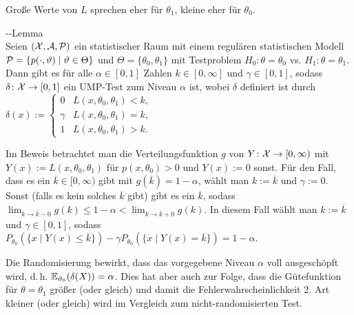 \begin{Bem}
    Große Werte von $L$ sprechen eher für $\theta_1$, kleine eher für $\theta_0$.
\end{Bem}

\begin{Satz}{--Lemma}\\
    Seien $(\X, \A, \P)$ ein statistischer Raum mit einem regulären statistischen Modell\\
    $\P = \{p(\cdot, \theta) \;|\; \theta \in \Theta\}$ und
    $\Theta = \{\theta_0, \theta_1\}$ mit Testproblem
    $H_0\colon \theta = \theta_0$ vs. $H_1\colon \theta = \theta_1$.\\
    Dann gibt es für alle $\alpha \in [0, 1]$ Zahlen $k \in [0, \infty]$ und $\gamma \in [0, 1]$,
    sodass $\delta\colon \X \rightarrow [0, 1]$ ein UMP-Test zum Niveau $\alpha$ ist, wobei
    $\delta$ definiert ist durch
    $\delta(x) := \begin{cases}0 & L(x, \theta_0, \theta_1) < k,\\
    \gamma & L(x, \theta_0, \theta_1) = k,\\1 & L(x, \theta_0, \theta_1) > k.\end{cases}$
\end{Satz}

\begin{Bem}
    Im Beweis betrachtet man die Verteilungsfunktion $g$ von $Y\colon \X \rightarrow [0, \infty)$
    mit $Y(x) := L(x, \theta_0, \theta_1)$ für $p(x, \theta_0) > 0$ und $Y(x) := 0$ sonst.
    Für den Fall, dass es ein $\overline{k} \in [0, \infty)$ gibt mit
    $g(\overline{k}) = 1 - \alpha$, wählt man $k := \overline{k}$ und $\gamma := 0$.
    Sonst (falls es kein solches $\overline{k}$ gibt) gibt es ein $\overline{k}$, sodass
    $\lim_{k \to \overline{k}-0} g(k) \le 1 - \alpha < \lim_{k \to \overline{k}+0} g(k)$.
    In diesem Fall wählt man $k := \overline{k}$ und $\gamma \in [0, 1]$, sodass
    $P_{\theta_0}(\{x \;|\; Y(x) \le \overline{k}\}) -
    \gamma P_{\theta_0}(\{x \;|\; Y(x) = \overline{k}\}) = 1 - \alpha$.

    Die Randomisierung bewirkt, dass das vorgegebene Niveau $\alpha$ voll ausgeschöpft wird,
    d.\,h. $\EE_{\theta_0}(\delta(X)) = \alpha$.
    Dies hat aber auch zur Folge, dass die Gütefunktion für $\theta = \theta_1$
    größer (oder gleich) und damit die
    Fehlerwahrscheinlichkeit 2. Art kleiner (oder gleich) wird
    im Vergleich zum nicht-randomisierten Test.
\end{Bem}

